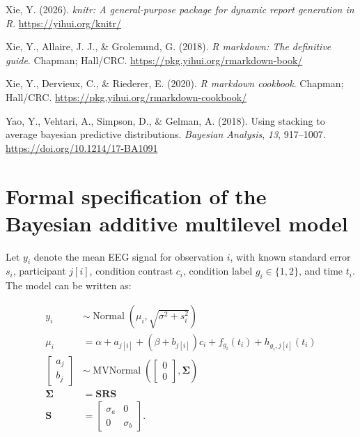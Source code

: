\documentclass[
  doc,
  floatsintext,
  longtable,
  a4paper,
  nolmodern,
  notxfonts,
  notimes,
  colorlinks=true,linkcolor=blue,citecolor=blue,urlcolor=blue]{apa7}
\newlength{\cslhangindent}
\newenvironment{CSLReferences}[2] %
 {\begin{list}{}{%
  \setlength{\itemindent}{0pt}
  \setlength{\leftmargin}{0pt}
  \setlength{\parsep}{0pt}
  \ifodd #1
   \setlength{\leftmargin}{\cslhangindent}
   \setlength{\itemindent}{-1\cslhangindent}
  \fi
  \setlength{\itemsep}{#2\baselineskip}}}
 {\end{list}}
\begin{document}
\begin{CSLReferences}{1}{0}
Xie, Y. (2026). \emph{{knitr}: A general-purpose package for dynamic
report generation in {R}}. \url{https://yihui.org/knitr/}

Xie, Y., Allaire, J. J., \& Grolemund, G. (2018). \emph{R markdown: The
definitive guide}. Chapman; Hall/CRC.
\url{https://pkg.yihui.org/rmarkdown-book/}

Xie, Y., Dervieux, C., \& Riederer, E. (2020). \emph{R markdown
cookbook}. Chapman; Hall/CRC.
\url{https://pkg.yihui.org/rmarkdown-cookbook/}

Yao, Y., Vehtari, A., Simpson, D., \& Gelman, A. (2018). Using stacking
to average bayesian predictive distributions. \emph{Bayesian Analysis},
\emph{13}, 917--1007. \url{https://doi.org/10.1214/17-BA1091}

\end{CSLReferences}

\newpage

\appendix

\section{Formal specification of the Bayesian additive multilevel
model}\label{apx-math}

\setlength{\parindent}{0pt}
\setlength{\parskip}{6pt}

Let \(y_i\) denote the mean EEG signal for observation \(i\), with known
standard error \(s_i\), participant \(j[i]\), condition contrast
\(c_i\), condition label \(g_i \in \{1,2\}\), and time \(t_i\). The
model can be written as:

\[
\begin{aligned}
y_i &\sim \operatorname{Normal}\left(\mu_i,\sqrt{\sigma^2 + s_i^2}\right) \\[4pt]
\mu_i
&=
\alpha
+ a_{j[i]}
+ \left(\beta + b_{j[i]}\right)c_i
+ f_{g_i}(t_i)
+ h_{g_i,j[i]}(t_i) \\[4pt]
\begin{bmatrix}
a_j \\
b_j
\end{bmatrix}
&\sim \operatorname{MVNormal}
\left(
\begin{bmatrix}
0 \\
0
\end{bmatrix},
\boldsymbol{\Sigma}
\right) \\[4pt]
\boldsymbol{\Sigma} &= \mathbf{S}\mathbf{R}\mathbf{S} \\[4pt]
\mathbf{S} &=
\begin{bmatrix}
\sigma_a & 0 \\
0 & \sigma_b
\end{bmatrix}.
\end{aligned}
\]
\end{document}
